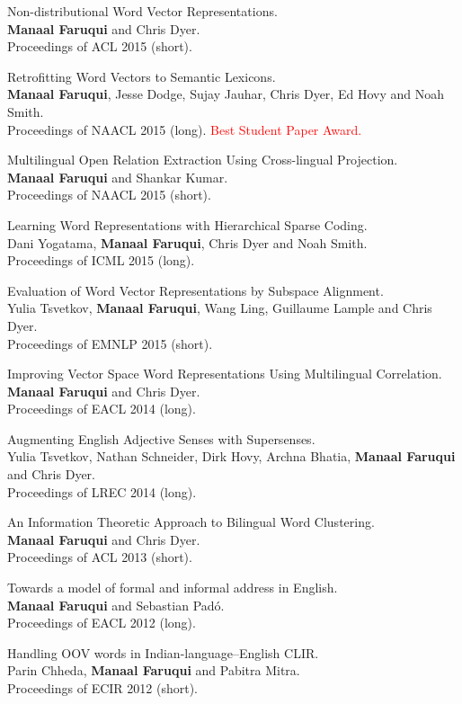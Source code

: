 \documentclass[margin,line]{res}
\begin{document}
\begin{resume}
Non-distributional Word Vector Representations.\\
\textbf{Manaal Faruqui} and Chris Dyer.\\
Proceedings of ACL 2015 (short).

Retrofitting Word Vectors to Semantic Lexicons.\\
\textbf{Manaal Faruqui}, Jesse Dodge, Sujay Jauhar, Chris Dyer, Ed Hovy and Noah Smith.\\
Proceedings of NAACL 2015 (long). \textcolor{red}{Best Student Paper Award.}

Multilingual Open Relation Extraction Using Cross-lingual Projection.\\
\textbf{Manaal Faruqui} and Shankar Kumar.\\
Proceedings of NAACL 2015 (short).

Learning Word Representations with Hierarchical Sparse Coding.\\
Dani Yogatama, \textbf{Manaal Faruqui}, Chris Dyer and Noah Smith.\\
Proceedings of ICML 2015 (long).

Evaluation of Word Vector Representations by Subspace Alignment.\\
Yulia Tsvetkov, \textbf{Manaal Faruqui}, Wang Ling, Guillaume Lample and Chris Dyer.\\
Proceedings of EMNLP 2015 (short).

Improving Vector Space Word Representations Using Multilingual Correlation.\\
\textbf{Manaal Faruqui} and Chris Dyer.\\
Proceedings of EACL 2014 (long).

Augmenting English Adjective Senses with Supersenses.\\
Yulia Tsvetkov, Nathan Schneider, Dirk Hovy, Archna Bhatia, \textbf{Manaal Faruqui} and Chris Dyer.\\
Proceedings of LREC 2014 (long).

An Information Theoretic Approach to Bilingual Word Clustering.\\
\textbf{Manaal Faruqui} and Chris Dyer.\\
Proceedings of ACL 2013 (short).

Towards a model of formal and informal address in English.\\
\textbf{Manaal Faruqui} and Sebastian Pad\'{o}.\\
Proceedings of EACL 2012 (long).

Handling OOV words in Indian-language--English CLIR.\\
Parin Chheda, \textbf{Manaal Faruqui} and Pabitra Mitra.\\
Proceedings of ECIR 2012 (short).


\end{resume}
\end{document}
